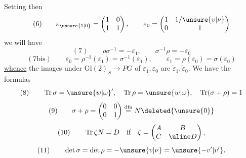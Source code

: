 Setting then
\[
(6)\qquad \varepsilon_{\unsure{1|0}}=\begin{pmatrix}1&0\\1&1\end{pmatrix},\qquad \varepsilon_0=\begin{pmatrix}1&1/\unsure{v|\nu}\\0&1\end{pmatrix}
\]
we will have
\[
(7)\qquad \rho\sigma^{-1}=-\varepsilon_1,\qquad\sigma^{-1}\rho=-\varepsilon_0
\]
\[
(7\mathrm{bis})\qquad \varepsilon_0=\rho^{-1}(\varepsilon_1)=\sigma^{-1}(\varepsilon_1),\qquad\varepsilon_1=\rho(\varepsilon_0)=\sigma(\varepsilon_0)
\]
\uline{whence} the images under $\mathrm{Gl}(2)_S\longrightarrow PG$ of  $\varepsilon_1,\varepsilon_0$ are $\widetilde\varepsilon_1,\widetilde\varepsilon_0$. We have the formulas
\[
(8)\qquad \operatorname{Tr}\sigma=\unsure{w|\omega}',\quad\operatorname{Tr}\rho=\unsure{w|\omega},\quad\operatorname{Tr}(\sigma+\rho)=1
\]
\[
(9)\qquad \sigma+\rho=\begin{pmatrix}0&0\\0&1\end{pmatrix}\overset{\mathrm{dfn}}=N\deleted{\unsure{0}}
\]
\[
(10)\qquad \operatorname{Tr}\zeta N=D\quad\text{if}\quad\zeta=\begin{pmatrix}A&B\\C&\uline D\end{pmatrix},
\]
\[
(11)\qquad \det\sigma=\det\rho=-\unsure{v|\nu}=\unsure{-v'|v'}.
\]

